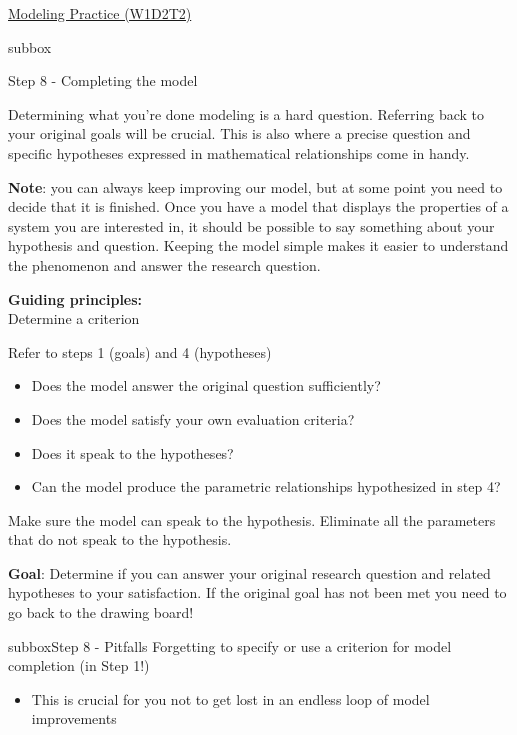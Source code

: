 \begin{textbox}{\href{https://compneuro.neuromatch.io/tutorials/W1D2_ModelingPractice/W1D2_Intro.html}{Modeling Practice  (W1D2T2)} }

\begin{subbox}{subbox}{Step 8 - Completing the model

}
\scriptsize
Determining what you're done modeling is a hard question. Referring back to your original goals will be crucial. This is also where a precise question and specific hypotheses expressed in mathematical relationships come in handy. 

\textbf{Note}: you can always keep improving our model, but at some point you need to decide that it is finished. Once you have a model that displays the properties of a system you are interested in, it should be possible to say something about your hypothesis and question. Keeping the model simple makes it easier to understand the phenomenon and answer the research question. 

\textbf{Guiding principles:}\\
Determine a criterion

Refer to steps 1 (goals) and 4 (hypotheses)
\begin{itemize}
    \item 
 Does the model answer the original question sufficiently?
   \item  Does the model satisfy your own evaluation criteria?
  \item  Does it speak to the hypotheses?
 \item  Can the model produce the parametric relationships hypothesized in step 4?
\end{itemize}
  
Make sure the model can speak to the hypothesis. Eliminate all the parameters that do not speak to the hypothesis.

\textbf{Goal}: Determine if you can answer your original research question and related hypotheses to your satisfaction. If the original goal has not been met you need to go back to the drawing board!
  \end{subbox}
\begin{subbox}{subbox}{Step 8 - Pitfalls }
\scriptsize
Forgetting to specify or use a criterion for model completion (in Step 1!)
\begin{itemize}
    \item This is crucial for you not to get lost in an endless loop of model improvements\end{itemize}
  


\end{subbox}
\end{textbox}
